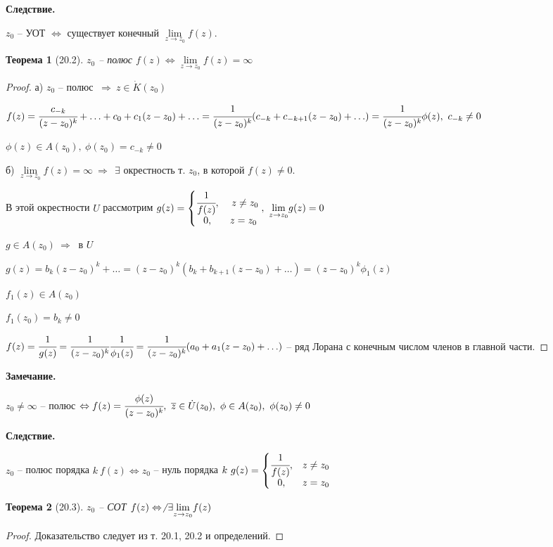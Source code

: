 \documentclass[draft]{report}
\renewcommand{\bf}{\bfseries}
\newcommand{\then}{\ \Rightarrow\ }
\newcommand{\mlim}[1]{\underset{#1}{\lim}}
\newcommand{\LRA}{\Leftrightarrow}
\renewcommand{\bar}{\overline}
\renewcommand{\f}{\phi}
\newcommand{\E}{\ \exists}
\newcommand{\z}{\bar{z}}
\newcommand{\sys}[1]{\left\{\begin{matrix}#1\end{matrix}\right.}
\newtheorem*{theor}{Теорема}
\theoremstyle{remark}
\begin{document}
{\bf Следствие.}

$z_0$ -- УОТ $\LRA$ существует конечный $\mlim{z\to z_0}f(z)$.

\begin{theor}[20.2]
$z_0$ -- полюс $f(z)\LRA\mlim{z\to z_0}f(z)=\infty$
\end{theor}
\begin{proof}
а) $z_0$ -- полюс $\then z\in\dot{K}(z_0)$

$f(z)=\cfrac{c_{-k}}{(z-z_0)^k}+\ldots+c_0+c_1(z-z_0)+\ldots=\cfrac{1}{(z-z_0)^k}(c_{-k}+c_{-k+1}(z-z_0)+\ldots)=\cfrac{1}{(z-z_0)^k}\f(z),\ c_{-k}\neq 0$

$\f(z)\in A(z_0),\ \f(z_0)=c_{-k}\neq0$

б) $\mlim{z\to z_0}f(z)=\infty\then \E$ окрестность т. $z_0$, в которой $f(z)\neq0$.

В этой окрестности $U$ рассмотрим $g(z)=\sys{\cfrac1{f(z)},&\ z\neq z_0 \\ 0, &z=z_0},\ \mlim{z\to z_0} g(z)=0$

$g\in A(z_0)\then$ в $U$

$g(z)=b_k(z-z_0)^k+\ldots=(z-z_0)^k(b_k+b_{k+1}(z-z_0)+\ldots)=(z-z_0)^k\f_1(z)$

$f_1(z)\in A(z_0)$

$f_1(z_0)=b_k\neq 0$

$f(z)=\cfrac{1}{g(z)}=\cfrac1{(z-z_0)^k}\cfrac1{\f_1(z)}=\cfrac1{(z-z_0)^k}(a_0+a_1(z-z_0)+\ldots)$ -- ряд Лорана с конечным числом членов в главной части.
\end{proof}

{\bf Замечание.}

$z_0\neq \infty$ -- полюс $\LRA f(z)=\cfrac{\f(z)}{(z-z_0)^k},\ \z\in \dot{U}(z_0),\ \f\in A(z_0),\ \f(z_0)\neq 0$

{\bf Следствие.}

$z_0$ -- полюс порядка $k\ f(z) \LRA z_0$ -- нуль порядка $k\ g(z)=\sys{\cfrac1{f(z)},&z\neq z_0 \\ 0, &z=z_0}$

\begin{theor}[20.3]
$z_0$ -- СОТ $f(z) \LRA \not\E\mlim{z\to z_0}f(z)$
\end{theor}
\begin{proof}
Доказательство следует из т. 20.1, 20.2 и определений.
\end{proof}
\end{document}
